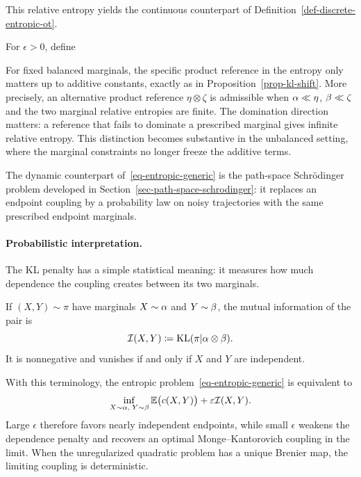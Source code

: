 This relative entropy yields the continuous counterpart of Definition~\ref{def-discrete-entropic-ot}.
\begin{defn}\label{def-continuous-entropic-ot}
For $\epsilon>0$, define
\end{defn}
%
For fixed balanced marginals, the specific product reference in the entropy only matters up to additive constants, exactly as in Proposition~\ref{prop-kl-shift}. More precisely, an alternative product reference $\eta\otimes\zeta$ is admissible when $\alpha\ll\eta$, $\beta\ll\zeta$ and the two marginal relative entropies are finite. The domination direction matters: a reference that fails to dominate a prescribed marginal gives infinite relative entropy. This distinction becomes substantive in the unbalanced setting, where the marginal constraints no longer freeze the additive terms.

The dynamic counterpart of~\eqref{eq-entropic-generic} is the path-space Schr\"odinger problem developed in Section~\ref{sec-path-space-schrodinger}: it replaces an endpoint coupling by a probability law on noisy trajectories with the same prescribed endpoint marginals.

\paragraph{Probabilistic interpretation.}

The KL penalty has a simple statistical meaning: it measures how much dependence the coupling creates between its two marginals.

\begin{defn}\label{def-mutual-information}
	If $(X,Y)\sim\pi$ have marginals $X\sim\alpha$ and $Y\sim\beta$, the mutual information of the pair is
	\[
		\mathcal{I}(X,Y)\coloneqq \operatorname{KL}(\pi|\alpha\otimes\beta).
	\]
	It is nonnegative and vanishes if and only if $X$ and $Y$ are independent.
\end{defn}
With this terminology, the entropic problem~\eqref{eq-entropic-generic} is equivalent to
\[
	\inf_{X\sim\alpha,\;Y\sim\beta}
	\mathbb{E}\bigl(c(X,Y)\bigr)+\varepsilon\mathcal{I}(X,Y).
\]
Large $\epsilon$ therefore favors nearly independent endpoints, while small $\epsilon$ weakens the dependence penalty and recovers an optimal Monge--Kantorovich coupling in the limit. When the unregularized quadratic problem has a unique Brenier map, the limiting coupling is deterministic.

